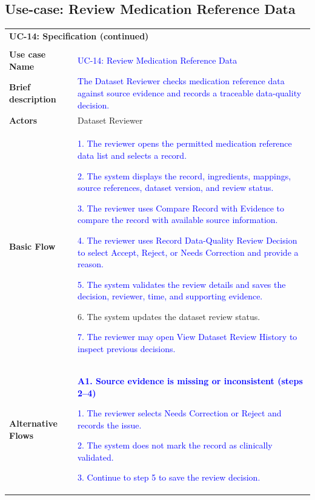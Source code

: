 \subsection{Use-case: Review Medication Reference Data}
\label{uc:uc-14}
\begin{longtable}{|p{}|p{}|}
\hline
\endfirsthead
\multicolumn{2}{l}{\textbf{UC-14: Specification (continued)}}\\\\
\hline
\endhead
\textbf{Use case Name} &
\textcolor{blue}{UC-14: Review Medication Reference Data}
\\ \hline
\textbf{Brief description} &
\textcolor{blue}{The Dataset Reviewer checks medication reference data against source evidence and records a traceable data-quality decision.}
\\ \hline
\textbf{Actors} & Dataset Reviewer \\ \hline
\textbf{Basic Flow} &
\textcolor{blue}{1. The reviewer opens the permitted medication reference data list and selects a record.}\par
\textcolor{blue}{2. The system displays the record, ingredients, mappings, source references, dataset version, and review status.}\par
\textcolor{blue}{3. The reviewer uses Compare Record with Evidence to compare the record with available source information.}\par
\textcolor{blue}{4. The reviewer uses Record Data-Quality Review Decision to select Accept, Reject, or Needs Correction and provide a reason.}\par
\textcolor{blue}{5. The system validates the review details and saves the decision, reviewer, time, and supporting evidence.}\par
6. The system updates the dataset review status.\par
\textcolor{blue}{7. The reviewer may open View Dataset Review History to inspect previous decisions.}
\\ \hline
\textbf{Alternative Flows} &
\textcolor{blue}{\textbf{A1. Source evidence is missing or inconsistent (steps 2--4)}}\par
\textcolor{blue}{1. The reviewer selects Needs Correction or Reject and records the issue.}\par
\textcolor{blue}{2. The system does not mark the record as clinically validated.}\par
\textcolor{blue}{3. Continue to step 5 to save the review decision.}
\\ \hline

\end{longtable}
